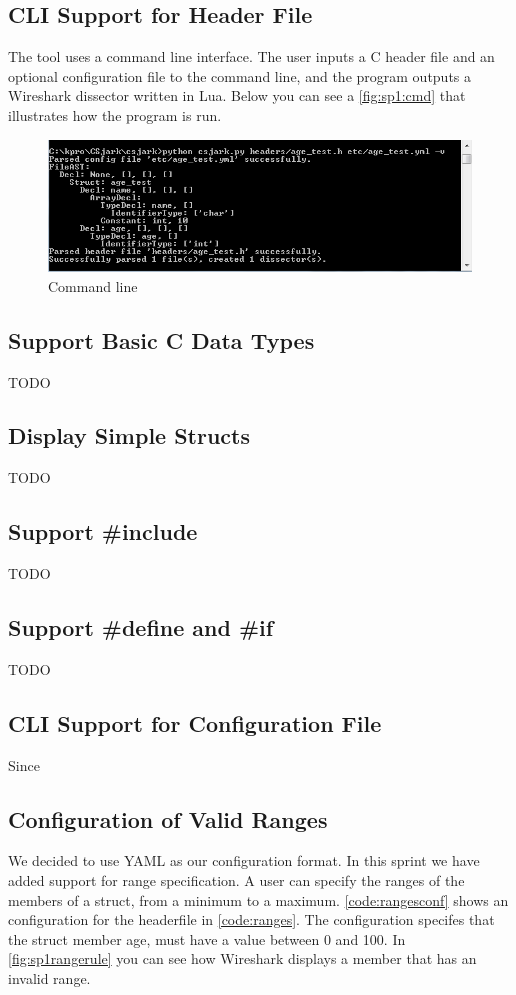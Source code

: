 \subsection{CLI Support for Header File}
The tool uses a command line interface. The user inputs a C header file and
an optional configuration file to the command line, and the program outputs a
Wireshark dissector written in Lua. Below you can see a \autoref{fig:sp1:cmd}
that illustrates how the program is run.

\begin{figure}[ht]
	\includegraphics[width=\textwidth]{./sprints/img/cmd_agetest_run}
	\caption{Command line\label{fig:sp1:cmd}}
\end{figure}

\subsection{Support Basic C Data Types}
TODO

\subsection{Display Simple Structs}
TODO

\subsection{Support \#include}
TODO

\subsection{Support \#define and \#if}
TODO

\subsection{CLI Support for Configuration File}
Since 

\subsection{Configuration of Valid Ranges}
We decided to use YAML as our configuration format. In this sprint we have
added support for range specification. A user can specify the ranges of the
members of a struct, from a minimum to a maximum. \autoref{code:rangesconf} 
shows an configuration for the headerfile in \autoref{code:ranges}. The 
configuration specifes that the struct member age, must have a value between 0 
and 100.  In \autoref{fig:sp1rangerule} you can see how Wireshark displays a 
member that has an invalid range. 

